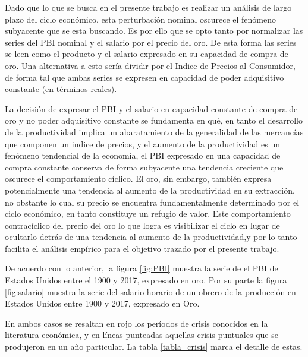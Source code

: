 \documentclass[a4paper]{article}
\begin{document}
Dado que lo que se busca en el presente trabajo es realizar un análisis de largo plazo del ciclo económico, esta perturbación nominal oscurece el fenómeno subyacente que se esta buscando. Es por ello que se opto tanto por normalizar las series del PBI nominal y el salario por el precio del oro. De esta forma las series se leen como el producto y el salario expresado en su capacidad de compra de oro. Una alternativa a esto sería dividir por el Indice de Precios al Consumidor, de forma tal que ambas series se expresen en capacidad de poder adquisitivo constante (en términos reales). 

La decisión de expresar el PBI y el salario en capacidad constante de compra de oro y no poder adquisitivo constante se fundamenta en qué, en tanto el desarrollo de la productividad implica un abaratamiento de la generalidad de las mercancías que componen un indice de precios, y el aumento de la productividad es un fenómeno tendencial de la economía, el PBI expresado en una capacidad de compra constante conserva de forma subyacente una tendencia creciente que oscurece el comportamiento cíclico. El oro, sin embargo, también expresa potencialmente una tendencia al aumento de la productividad en su extracción, no obstante lo cual su precio se encuentra fundamentalmente determinado por el ciclo económico, en tanto constituye un refugio de valor. Este comportamiento contracíclico del precio del oro lo que logra es visibilizar el ciclo en lugar de ocultarlo detrás de una tendencia al aumento de la productividad,y por lo tanto facilita el análisis empírico para el objetivo trazado por el presente trabajo. 

De acuerdo con lo anterior, la figura \ref{fig:PBI} muestra la serie de el PBI de Estados Unidos entre el 1900 y 2017, expresado en oro. Por su parte la figura \ref{fig:salario} muestra la serie del salario horario de un obrero de la producción en Estados Unidos entre 1900 y 2017, expresado en Oro.

 En ambos casos se resaltan en rojo los períodos de crisis conocidos en la literatura económica, y en líneas punteadas aquellas crisis puntuales que se produjeron en un año particular. La tabla \ref{tabla_crisis} marca el detalle de estas.
\end{document}
